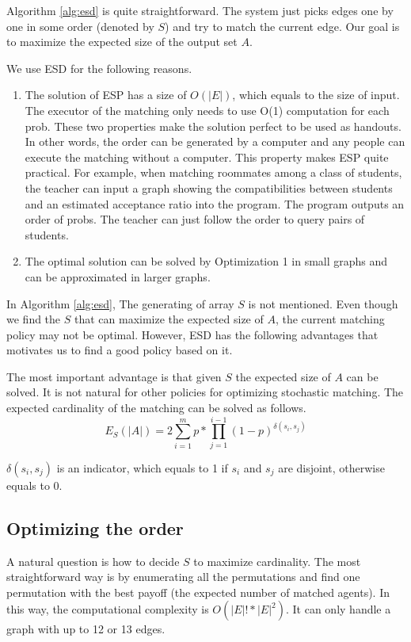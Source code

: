 \documentclass[letterpaper]{article}
\begin{document}
Algorithm \ref{alg:esd} is quite straightforward. The system just picks edges one by one in some order (denoted by $S$) and try to match the current edge. Our goal is to maximize the expected size of the output set $A$.

We use ESD for the following reasons.
\begin{enumerate}
	\item The solution of ESP has a size of $O(|E|)$, which equals to the size of input. The executor of the matching only needs to use O(1) computation for each prob. These two properties make the solution perfect to be used as handouts. In other words, the order can be generated by a computer and any people can execute the matching without a computer.
	This property makes ESP quite practical. For example, when matching roommates among a class of students, the teacher can input a graph showing the compatibilities between students and an estimated acceptance ratio into the program. The program outputs an order of probs. The teacher can just follow the order to query pairs of students. 
	\item The optimal solution can be solved by Optimization 1 in small graphs and can be approximated in larger graphs.
\end{enumerate}

In Algorithm \ref{alg:esd}, The generating of array $S$ is not mentioned.
Even though we find the $S$ that can maximize the expected size of $A$, the current matching policy may not be optimal.
However, ESD has the following advantages that motivates us to find a good policy based on it.

The most important advantage is that given $S$ the expected size of $A$ can be solved. It is not natural for other policies for optimizing stochastic matching. The expected cardinality of the matching can be solved as follows.
\begin{equation}
E_S(|A|)=2\sum_{i=1}^m p*\prod_{j=1}^{i-1}(1-p)^{\delta(s_i,s_j)}
\end{equation}

$\delta(s_i,s_j)$ is an indicator, which equals to 1 if $s_i$ and $s_j$ are disjoint, otherwise equals to 0.

\subsection{Optimizing the order}
A natural question is how to decide $S$ to maximize cardinality.
The most straightforward way is by enumerating all the permutations and find one permutation with the best payoff (the expected number of matched agents).
In this way, the computational complexity is $O(|E|!*|E|^2)$.
It can only handle a graph with up to 12 or 13 edges.
\end{document}
